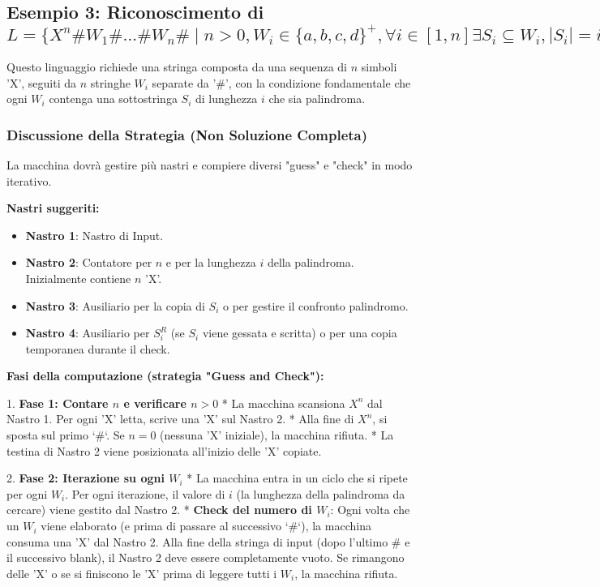\documentclass[a4paper]{article}
\begin{document}
\subsection{Esempio 3: Riconoscimento di $L = \{X^n \# W_1 \# \dots \# W_n \# \mid n>0, W_i \in \{a,b,c,d\}^+, \forall i \in [1,n] \exists S_i \subseteq W_i, |S_i|=i, S_i = S_i^R \}$}
Questo linguaggio richiede una stringa composta da una sequenza di $n$ simboli 'X', seguiti da $n$ stringhe $W_i$ separate da '#', con la condizione fondamentale che ogni $W_i$ contenga una sottostringa $S_i$ di lunghezza $i$ che sia palindroma.

\subsubsection{Discussione della Strategia (Non Soluzione Completa)}
La macchina dovrà gestire più nastri e compiere diversi "guess" e "check" in modo iterativo.

\textbf{Nastri suggeriti:}
\begin{itemize}
    \item \textbf{Nastro 1}: Nastro di Input.
    \item \textbf{Nastro 2}: Contatore per $n$ e per la lunghezza $i$ della palindroma. Inizialmente contiene $n$ 'X'.
    \item \textbf{Nastro 3}: Ausiliario per la copia di $S_i$ o per gestire il confronto palindromo.
    \item \textbf{Nastro 4}: Ausiliario per $S_i^R$ (se $S_i$ viene gessata e scritta) o per una copia temporanea durante il check.
\end{itemize}

\textbf{Fasi della computazione (strategia "Guess and Check"):}

1.  \textbf{Fase 1: Contare $n$ e verificare $n>0$}
    *   La macchina scansiona $X^n$ dal Nastro 1. Per ogni 'X' letta, scrive una 'X' sul Nastro 2.
    *   Alla fine di $X^n$, si sposta sul primo `#`. Se $n=0$ (nessuna 'X' iniziale), la macchina rifiuta.
    *   La testina di Nastro 2 viene posizionata all'inizio delle 'X' copiate.

2.  \textbf{Fase 2: Iterazione su ogni $W_i$}
    *   La macchina entra in un ciclo che si ripete per ogni $W_i$. Per ogni iterazione, il valore di $i$ (la lunghezza della palindroma da cercare) viene gestito dal Nastro 2.
    *   \textbf{Check del numero di $W_i$}: Ogni volta che un $W_i$ viene elaborato (e prima di passare al successivo `#`), la macchina consuma una 'X' dal Nastro 2. Alla fine della stringa di input (dopo l'ultimo $\#$ e il successivo blank), il Nastro 2 deve essere completamente vuoto. Se rimangono delle 'X' o se si finiscono le 'X' prima di leggere tutti i $W_i$, la macchina rifiuta.
\end{document}
